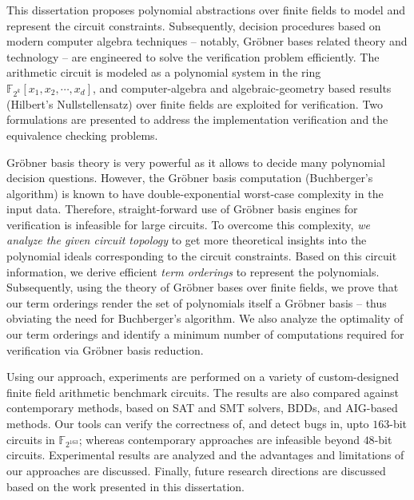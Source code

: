This dissertation proposes polynomial abstractions over finite fields
to model and represent the circuit constraints. Subsequently, 
decision procedures based on modern computer algebra techniques --
notably, Gr\"obner bases related theory and technology -- are
engineered to solve the verification problem efficiently. The
arithmetic circuit is modeled as a polynomial system in the ring
${\mathbb{F}}_{2^k}[x_1,x_2,\cdots,x_d]$, and computer-algebra and
algebraic-geometry based results (Hilbert's Nullstellensatz) over
finite fields are exploited for verification. Two formulations are
presented to address the implementation verification and the
equivalence checking problems.

Gr\"obner basis theory is very powerful as it allows to decide many
polynomial decision questions. However, the Gr\"obner basis
computation (Buchberger's algorithm) is known to have
double-exponential worst-case complexity in the input data. Therefore,
straight-forward use of Gr\"obner basis engines for verification is
infeasible for large circuits. To overcome this complexity, {\it we
  analyze the given circuit topology} to get more theoretical insights
into the polynomial ideals corresponding to the circuit
constraints. Based on this circuit information,  we derive efficient
{\it term orderings} to represent the polynomials. Subsequently, using
the theory of Gr\"obner bases over finite fields, we prove that our
term orderings render the set of polynomials itself a Gr\"obner basis
-- thus obviating the need for Buchberger's algorithm. We also analyze
the optimality of our term orderings and identify a minimum number of
computations required for verification via Gr\"obner basis reduction.


Using our approach, experiments are performed on a variety of
custom-designed finite field arithmetic benchmark circuits. The
results are also compared against contemporary methods, based on SAT
and SMT solvers, BDDs, and AIG-based methods. Our tools can verify the
correctness of, and detect bugs in, upto $163$-bit circuits in
$\mathbb{F}_{2^{163}}$; whereas contemporary approaches are
infeasible beyond $48$-bit circuits. Experimental results are analyzed and
the advantages and limitations of our approaches are
discussed. Finally, future research directions are discussed based on
the work presented in this dissertation.

